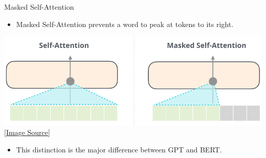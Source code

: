 \begin{frame}[fragile]{Masked Self-Attention}

    \begin{itemize}
        \item Masked Self-Attention prevents a word to peak at tokens to its right.
    \end{itemize}

    \begin{center}
        \includegraphics[scale=0.3]{../images/img_11.png} \\
        \href{https://jalammar.github.io/illustrated-gpt2/}{[Image Source]}
    \end{center}

    \begin{itemize}
        \item This distinction is the major difference between GPT and BERT.
    \end{itemize}

\end{frame}